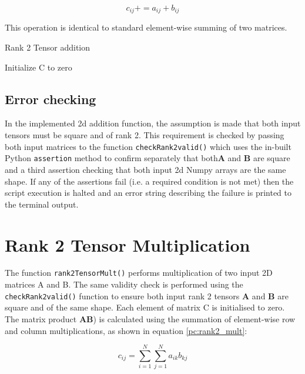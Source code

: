 \documentclass[10 pt, conference]{cssconf}
\begin{document}
\begin{equation}\label{eq:sum_2d}
    c_{ij} \mathrel{{+}{=}}
     a_{ij} + b_{ij}
\end{equation}%

This operation is identical to standard element-wise summing of two matrices.

\begin{algorithm}[ht] \small
\caption{Rank 2 Tensor addition}\label{pc:rank2_add}
    	\SetAlgoLined
	Initialize C to zero\;
\end{algorithm}%

\subsection{Error checking}
In the implemented 2d addition function, the assumption is made that both input tensors must be square and of rank 2. This requirement is checked by passing both input matrices to the function \verb|checkRank2valid()| which uses the in-built Python \verb|assertion| method to confirm separately that both$\mathbf{A}$ and $\mathbf{B}$ are square and a third assertion checking that both input 2d Numpy arrays are the same shape. If any of the assertions fail (i.e. a required condition is not met) then the script execution is halted and an error string describing the failure is printed to the terminal output.

\section{Rank 2 Tensor Multiplication}
The function \verb|rank2TensorMult()| performs multiplication of two input 2D matrices A and B. The same validity check is performed using the \verb|checkRank2valid()| function to ensure both input rank 2 tensors $\mathbf{A}$ and $\mathbf{B}$ are square and of the same shape.
Each element of matrix C is initialised to zero. The matrix product $\mathbf{AB}$) is calculated using the summation of element-wise row and column multiplications, as shown in equation \ref{pc:rank2_mult}:

\begin{equation}\label{eq:product_2d}
    c_{ij} \mathrel{{=}}
     \sum_{i=1}^{N}\sum_{j=1}^{N} a_{ik}b_{kj}
\end{equation}%
\end{document}

